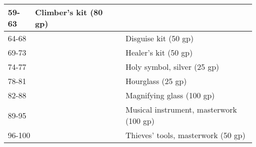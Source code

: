 \begin{longtable}{llll}
{\begin{minipage}[t]{3.276in}
59-63\end{minipage}} & \multicolumn{1}{|p{0.896in}|}{\begin{minipage}[t]{0.896in}\raggedright
Climber's kit (80 gp)\end{minipage}}\\
\hline
\multicolumn{3}{p{3.276in}|}{\begin{minipage}[t]{3.276in}\raggedright
64-68\end{minipage}} & \multicolumn{1}{|p{0.896in}|}{\begin{minipage}[t]{0.896in}\raggedright
Disguise kit (50 gp)\end{minipage}}\\
\hline
\multicolumn{3}{p{3.276in}|}{\begin{minipage}[t]{3.276in}\raggedright
69-73\end{minipage}} & \multicolumn{1}{|p{0.896in}|}{\begin{minipage}[t]{0.896in}\raggedright
Healer's kit (50 gp)\end{minipage}}\\
\hline
\multicolumn{3}{p{3.276in}|}{\begin{minipage}[t]{3.276in}\raggedright
74-77\end{minipage}} & \multicolumn{1}{|p{0.896in}|}{\begin{minipage}[t]{0.896in}\raggedright
Holy symbol, silver (25 gp)\end{minipage}}\\
\hline
\multicolumn{3}{p{3.276in}|}{\begin{minipage}[t]{3.276in}\raggedright
78-81\end{minipage}} & \multicolumn{1}{|p{0.896in}|}{\begin{minipage}[t]{0.896in}\raggedright
Hourglass (25 gp)\end{minipage}}\\
\hline
\multicolumn{3}{p{3.276in}|}{\begin{minipage}[t]{3.276in}\raggedright
82-88\end{minipage}} & \multicolumn{1}{|p{0.896in}|}{\begin{minipage}[t]{0.896in}\raggedright
Magnifying glass (100 gp)\end{minipage}}\\
\hline
\multicolumn{3}{p{3.276in}|}{\begin{minipage}[t]{3.276in}\raggedright
89-95\end{minipage}} & \multicolumn{1}{|p{0.896in}|}{\begin{minipage}[t]{0.896in}\raggedright
Musical instrument, masterwork (100 gp)\end{minipage}}\\
\hline
\multicolumn{3}{p{3.276in}|}{\begin{minipage}[t]{3.276in}\raggedright
96-100\end{minipage}} & \multicolumn{1}{|p{0.896in}|}{\begin{minipage}[t]{0.896in}\raggedright
Thieves' tools, masterwork (50 gp) \end{minipage}}\\
\hline
\end{longtable}
